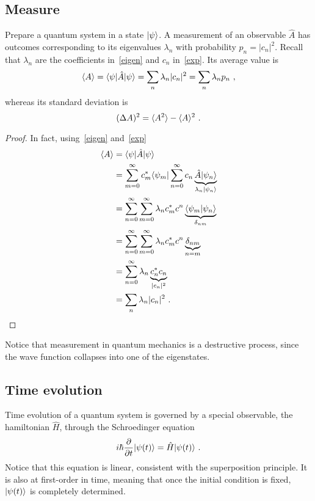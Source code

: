 \subsection{Measure}

    Prepare a quantum system in a state $\vert\psi\rangle$. A measurement of an observable $\hat A$ has outcomes corresponding to its eigenvalues $\lambda_n$ with probability $p_n = |c_n|^2$. Recall that $\lambda_n$ are the coefficients in~\eqref{eigen} and $c_n$ in~\eqref{exp}. Its average value is 
    \begin{equation}\label{avval}
        \langle A\rangle = \langle\psi\vert \hat A \vert\psi\rangle = \sum_{n} \lambda_n |c_n|^2 = \sum_{n} \lambda_n p_n ~,
    \end{equation}
    whereas its standard deviation is 
    \begin{equation*}
        (\Delta A)^2 = \langle A^2\rangle - \langle A\rangle^2 ~.
    \end{equation*}
    \begin{proof}
        In fact, using~\eqref{eigen} and~\eqref{exp}
        \begin{equation*}
        \begin{aligned}
            \langle A\rangle & = \langle\psi\vert \hat A \vert\psi\rangle \\ & = \sum_{m=0}^{\infty} c_m^* \langle\psi_m\vert \sum_{n=0}^{\infty} c_n \underbrace{\hat A \vert\psi_n\rangle}_{\lambda_n \vert\psi_n\rangle} \\ & = \sum_{n=0}^{\infty} \sum_{m=0}^{\infty} \lambda_n c^*_m c^n \underbrace{\langle\psi_m\vert\psi_n\rangle}_{\delta_{nm}} \\ & = \sum_{n=0}^{\infty} \sum_{m=0}^{\infty} \lambda_n c^*_m c^n \underbrace{\delta_{nm}}_{n=m} \\ & = \sum_{n=0}^{\infty} \lambda_n \underbrace{c^*_n c_n}_{|c_n|^2} \\ & = \sum_{n} \lambda_n |c_n|^2 ~.
        \end{aligned}
        \end{equation*}
    \end{proof}

    Notice that measurement in quantum mechanics is a destructive process, since the wave function collapses into one of the eigenstates.

\subsection{Time evolution}

    Time evolution of a quantum system is governed by a special observable, the hamiltonian $\hat H$, through the Schroedinger equation
    \begin{equation*}
        i \hbar \frac{\partial}{\partial t} \vert\psi(t)\rangle = \hat H \vert\psi(t)\rangle ~.
    \end{equation*}
    Notice that this equation is linear, consistent with the superposition principle. It is also at first-order in time, meaning that once the initial condition is fixed, $\vert\psi(t)\rangle$ is completely determined.
    
